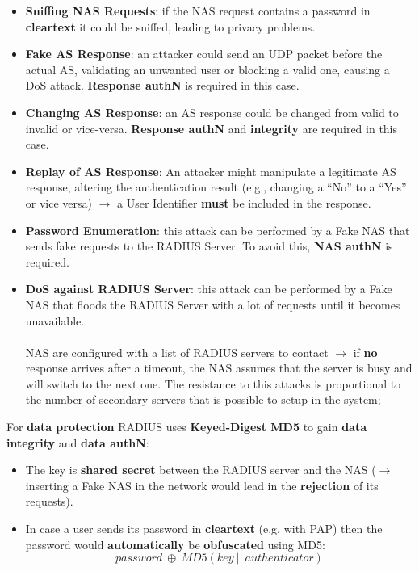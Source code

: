 \begin{itemize}
    \item \textbf{Sniffing NAS Requests}: if the NAS request contains a password in \textbf{cleartext} it could be sniffed, leading to privacy problems.
    \item \textbf{Fake AS Response}: an attacker could send an UDP packet before the actual AS, validating an unwanted user or blocking a valid one, causing a DoS attack. \textbf{Response authN} is required in this case.
    \item \textbf{Changing AS Response}: an AS response could be changed from valid to invalid or vice-versa. \textbf{Response authN} and \textbf{integrity} are required in this case.
    \item \textbf{Replay of AS Response}: An attacker might manipulate a legitimate
    AS response, altering the authentication result (e.g., changing a “No” to a “Yes” or vice versa) \(\rightarrow \) a User Identifier \textbf{must} be included in the response.
    \item \textbf{Password Enumeration}: this attack can be performed by a Fake NAS that sends fake requests to the RADIUS Server. To avoid this, \textbf{NAS authN} is required.
    \item \textbf{DoS against RADIUS Server}: this attack can be performed by a Fake NAS that floods the RADIUS Server with a lot of requests until it becomes unavailable.
    \\ 
    \\NAS are configured with a list of RADIUS servers to contact \(\rightarrow \) if \textbf{no} response arrives
    after a timeout, the NAS assumes that the server is busy and will switch to the next one.
    The resistance to this attacks is proportional to the number of secondary servers that is
    possible to setup in the system;
\end{itemize}
For \textbf{data protection} RADIUS uses \textbf{Keyed-Digest MD5} to gain \textbf{data integrity} and \textbf{data authN}:
\begin{itemize}
    \item The key is \textbf{shared secret} between the RADIUS server and the NAS (\(\rightarrow \) inserting a
    Fake NAS in the network would lead in the \textbf{rejection} of its requests).
    \item In case a user sends its password in \textbf{cleartext} (e.g. with PAP) then the password would
    \textbf{automatically} be \textbf{obfuscated} using MD5:
    \[
    password\ \oplus\  MD5(key\ ||\ authenticator) 
    \]
\end{itemize}
